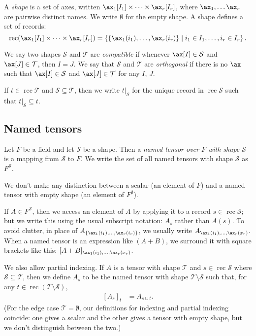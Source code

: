 \documentclass{article}
\DeclareMathOperator{\rec}{rec}
\newcommand{\restrict}[2]{\mathopen{}\left.#1\right|_{#2}}
\begin{document}
A \emph{shape} is a set of axes, written $\ax_1[I_1] \times \cdots \times \ax_r[I_r]$, where $\ax_1, \ldots \ax_r$ are pairwise distinct names. We write $\emptyset$ for the empty shape. A shape defines a set of records:
\begin{equation*}
\rec (\ax_1[I_1] \times \cdots \times \ax_r[I_r]) = \left\{\{\ax_1(i_1), \ldots, \ax_r(i_r)\} \mid i_1 \in I_1, \ldots, i_r \in I_r\right\}.
\end{equation*}

We say two shapes $\mathcal{S}$ and $\mathcal{T}$ are \emph{compatible} if whenever $\ax[I] \in \mathcal{S}$ and $\ax[J] \in \mathcal{T}$, then $I = J$. We say that $\mathcal{S}$ and $\mathcal{T}$ are \emph{orthogonal} if there is no $\ax$ such that $\ax[I] \in \mathcal{S}$ and $\ax[J] \in \mathcal{T}$ for any $I$, $J$.

If $t \in \rec \mathcal{T}$ and $\mathcal{S} \subseteq \mathcal{T}$, then we write $\restrict{t}{\mathcal{S}}$ for the unique record in $\rec \mathcal{S}$ such that $\restrict{t}{\mathcal{S}} \subseteq t$.

\subsection{Named tensors}

Let $F$ be a field and let $\mathcal{S}$ be a shape. Then a \emph{named tensor over $F$ with shape $\mathcal{S}$} is a mapping from $\mathcal{S}$ to $F$. We write the set of all named tensors with shape $\mathcal{S}$ as $F^{\mathcal{S}}$.

We don't make any distinction between a scalar (an element of $F$) and a named tensor with empty shape (an element of $F^\emptyset$).

If $A \in F^{\mathcal{S}}$, then we access an element of $A$ by applying it to a record $s \in \rec \mathcal{S}$; but we write this using the usual subscript notation: $A_s$ rather than $A(s)$. To avoid clutter, in place of $A_{\{\ax_1(i_1), \ldots, \ax_r(i_r)\}}$, we usually write $A_{\ax_1(i_1), \ldots, \ax_r(x_r)}$. When a named tensor is an expression like $(A+B)$, we surround it with square brackets like this: $[A+B]_{\ax_1(i_1), \ldots, \ax_r(x_r)}$.

We also allow partial indexing. If $A$ is a tensor with shape $\mathcal{T}$ and $s \in \rec \mathcal{S}$ where $\mathcal{S} \subseteq \mathcal{T}$, then we define $A_s$ to be the named tensor with shape $\mathcal{T} \setminus \mathcal{S}$ such that, for any $t \in \rec (\mathcal{T} \setminus \mathcal{S})$,
\begin{align*}
\left[A_s\right]_t &= A_{s \cup t}.
\end{align*}
(For the edge case $\mathcal{T} = \emptyset$, our definitions for indexing and partial indexing coincide: one gives a scalar and the other gives a tensor with empty shape, but we don't distinguish between the two.)
\end{document}
